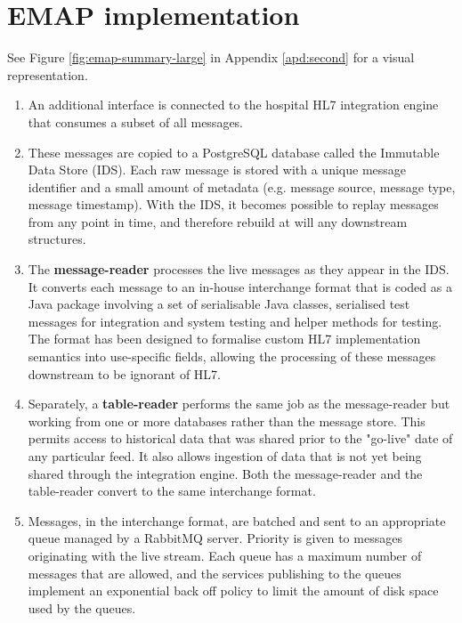 \documentclass[pmlr,twocolumn,10pt]{jmlr} %
\begin{document}

\newpage


\appendix

\section{EMAP implementation}\label{apd:first}

See Figure \ref{fig:emap-summary-large} in Appendix \ref{apd:second} for a visual representation.

\begin{enumerate}
    \item An additional interface is connected to the hospital HL7 integration engine that consumes a subset of all messages.
    \item These messages are copied to a PostgreSQL database called the Immutable Data Store (IDS). Each raw message is stored with a unique message identifier and a small amount of metadata (e.g. message source, message type, message timestamp). With the IDS, it becomes possible to replay messages from any point in time, and therefore rebuild at will any downstream structures.
    \item The \textbf{message-reader} processes the live messages as they appear in the IDS. It converts each message to an in-house interchange format that is coded as a Java package involving a set of serialisable Java classes, serialised test messages for integration and system testing and helper methods for testing. The format has been designed to formalise custom HL7 implementation semantics into use-specific fields, allowing the processing of these messages downstream to be ignorant of HL7. 
    \item Separately, a \textbf{table-reader} performs the same job as the message-reader but working from one or more databases rather than the message store. This permits access to historical data that was shared prior to the "go-live" date of any particular feed. It also allows ingestion of data that is not yet being shared through the integration engine. Both the message-reader and the table-reader convert to the same interchange format.
    \item Messages, in the interchange format, are batched and sent to an appropriate queue managed by a RabbitMQ server. Priority is given to messages originating with the live stream. Each queue has a maximum number of messages that are allowed, and the services publishing to the queues implement an exponential back off policy to limit the amount of disk space used by the queues.

\end{enumerate}
\end{document}
